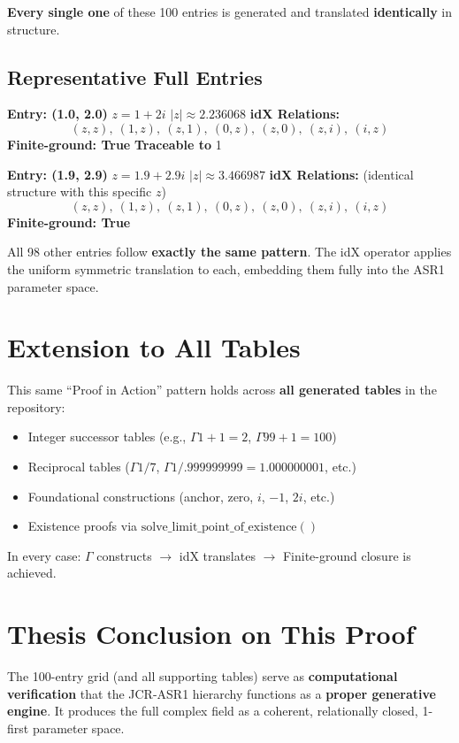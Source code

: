 \documentclass{article}
\begin{document}
\textbf{Every single one} of these 100 entries is generated and translated \textbf{identically} in structure.

\subsection{Representative Full Entries}

\textbf{Entry: (1.0, 2.0)}  
$z = 1 + 2i$ \quad $\lvert z \rvert \approx 2.236068$  
\textbf{idX Relations:}
\[
(z,z),\ 
(1,z),\ (z,1),\ 
(0,z),\ (z,0),\ 
(z,i),\ (i,z)
\]
\textbf{Finite-ground: True} \quad \textbf{Traceable to } 1 \in {}

\textbf{Entry: (1.9, 2.9)}  
$z = 1.9 + 2.9i$ \quad $\lvert z \rvert \approx 3.466987$  
\textbf{idX Relations:} (identical structure with this specific $z$)  
\[
(z,z),\ 
(1,z),\ (z,1),\ 
(0,z),\ (z,0),\ 
(z,i),\ (i,z)
\]
\textbf{Finite-ground: True}

All 98 other entries follow \textbf{exactly the same pattern}. The idX operator applies the uniform symmetric translation to each, embedding them fully into the ASR1 parameter space.

\section{Extension to All Tables}

This same ``Proof in Action'' pattern holds across \textbf{all generated tables} in the repository:
\begin{itemize}
    \item Integer successor tables (e.g., $\Gamma1+1 = 2$, $\Gamma99+1 = 100$)
    \item Reciprocal tables ($\Gamma1/7$, $\Gamma1/.999999999 = 1.000000001$, etc.)
    \item Foundational constructions (anchor, zero, $i$, $-1$, $2i$, etc.)
    \item Existence proofs via $\mathrm{solve\_limit\_point\_of\_existence()}$
\end{itemize}

In every case:  
$\Gamma$ constructs $\to$ idX translates $\to$ Finite-ground closure is achieved.

\section{Thesis Conclusion on This Proof}

The 100-entry grid (and all supporting tables) serve as \textbf{computational verification} that the JCR-ASR1 hierarchy functions as a \textbf{proper generative engine}. It produces the full complex field as a coherent, relationally closed, 1-first parameter space.
\end{document}

